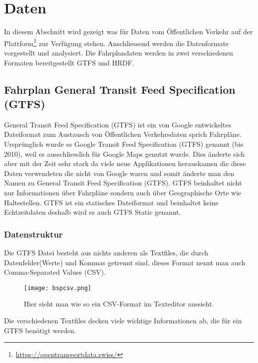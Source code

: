 \section{Daten}
\label{sec:daten}
In diesem Abschnitt wird gezeigt was für Daten vom Öffentlichen Verkehr auf der Plattform\footnote{\url{https://opentransportdata.swiss/}} zur Verfügung stehen. Anschliessend werden die Datenformate vorgestellt und analysiert. Die Fahrplandaten werden in zwei verschiedenen Formaten bereitgestellt GTFS und HRDF. 

\subsection{Fahrplan General Transit Feed Specification (GTFS)}
\label{sec:gtfs-static}
General Transit Feed Specification (GTFS) ist ein von Google entwickeltes Dateiformat zum Austausch von Öffentlichen Verkehrsdaten sprich Fahrpläne. Ursprünglich wurde es Google Transit Feed Specification (GTFS) genannt (bis 2010), weil es ausschliesslich für Google Maps genutzt wurde. Dies änderte sich aber mit der Zeit sehr stark da viele neue Applikationen herauskamen die diese Daten verwendeten die nicht von Google waren und somit änderte man den Namen zu General Transit Feed Specification (GTFS).\cite{gtfsbackground}
\newline
GTFS beinhaltet nicht nur Informationen über Fahrpläne sondern auch über Geographische Orte wie Haltestellen. GTFS ist ein statisches Dateiformat und beinhaltet keine Echtzeitdaten deshalb wird es auch GTFS Static genannt.\cite{gtfs}

\subsubsection{Datenstruktur}
\label{sec:gtfs-datenstruktur}
Die GTFS Datei besteht aus nichts anderen als Textfiles, die durch Datenfelder(Werte) und Kommas getrennt sind, dieses Format nennt man auch Comma-Separated Values (CSV).

\begin{figure}[]
	\centering
	\texttt{[image: bspcsv.png]}
	\caption{Hier sieht man wie so ein CSV-Format im Texteditor aussieht.}
	\label{fig:gtfs-dateiformat}
\end{figure}

Die verschiedenen Textfiles decken viele wichtige Informationen ab, die für ein GTFS benötigt werden.

